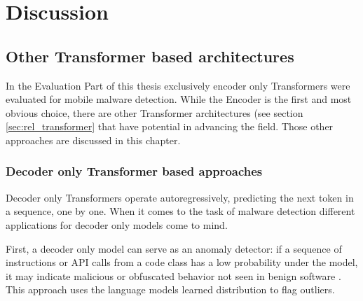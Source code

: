 \chapter{Discussion}

\label{Discussion} %

\section{Other Transformer based architectures}

In the Evaluation Part of this thesis exclusively encoder only Transformers were evaluated 
for mobile malware detection.
While the Encoder is the first and most obvious choice, there are other Transformer 
architectures (see section \ref{sec:rel_transformer} that have potential in 
advancing the field. Those other approaches are discussed in this chapter.

\subsection{Decoder only Transformer based approaches}

Decoder only Transformers operate autoregressively, predicting the next token in a sequence, one by one.
When it comes to the task of malware detection different applications for decoder only models come to mind.

First, a decoder only model can serve as an anomaly detector: 
if a sequence of instructions or API calls from a code class has a low probability under the model, 
it may indicate malicious or obfuscated behavior not seen in benign software 
\cite{tbased_anomalydetection,anomalybased_classification}. 
This approach uses the language models learned distribution to flag outliers.

